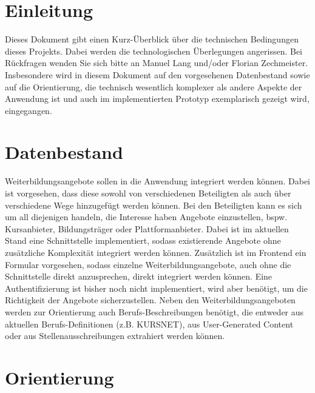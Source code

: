 \documentclass[10pt]{article}
\begin{document}
\maketitle

\section{Einleitung}

Dieses Dokument gibt einen Kurz-Überblick über die technischen Bedingungen
dieses Projekts. Dabei werden die technologischen Überlegungen angerissen. Bei
Rückfragen wenden Sie sich bitte an Manuel Lang und/oder Florian Zechmeister.
Insbesondere wird in diesem Dokument auf den vorgesehenen Datenbestand sowie auf
die Orientierung, die technisch wesentlich komplexer als andere Aspekte der
Anwendung ist und auch im implementierten Prototyp exemplarisch gezeigt wird,
eingegangen.

\section{Datenbestand}

Weiterbildungsangebote sollen in die Anwendung integriert werden können. Dabei
ist vorgesehen, dass diese sowohl von verschiedenen Beteiligten als auch über
verschiedene Wege hinzugefügt werden können. Bei den Beteiligten kann es sich um
all diejenigen handeln, die Interesse haben Angebote einzustellen, bspw.
Kursanbieter, Bildungsträger oder Plattformanbieter. Dabei ist im aktuellen
Stand eine Schnittstelle implementiert, sodass existierende Angebote ohne
zusätzliche Komplexität integriert werden können. Zusätzlich ist im Frontend ein
Formular vorgesehen, sodass einzelne Weiterbildungsangebote, auch ohne die
Schnittstelle direkt anzusprechen, direkt integriert werden können. Eine
Authentifizierung ist bisher noch nicht implementiert, wird aber benötigt, um
die Richtigkeit der Angebote sicherzustellen. Neben den Weiterbildungsangeboten
werden zur Orientierung auch Berufs-Beschreibungen benötigt, die entweder aus
aktuellen Berufs-Definitionen (z.B. KURSNET), aus User-Generated Content oder
aus Stellenausschreibungen extrahiert werden können.

\section{Orientierung}
\end{document}
